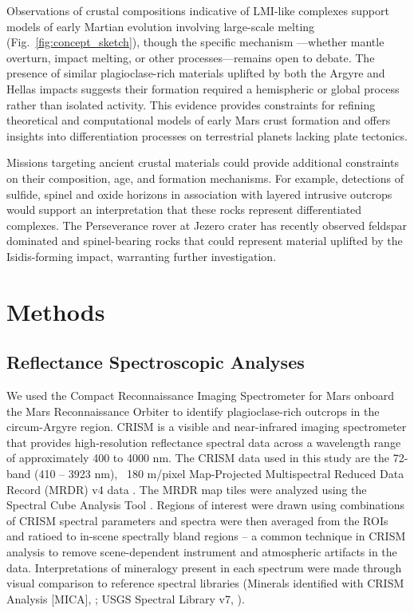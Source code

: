 \documentclass[12pt]{article}
\begin{document}
Observations of crustal compositions indicative of LMI-like complexes support models of early Martian evolution involving large-scale melting (Fig.~\ref{fig:concept_sketch}), though the specific mechanism ---whether mantle overturn, impact melting, or other processes---remains open to debate. The presence of similar plagioclase-rich materials uplifted by both the Argyre and Hellas impacts suggests their formation required a hemispheric or global process rather than isolated activity. This evidence provides constraints for refining theoretical and computational models of early Mars crust formation and offers insights into differentiation processes on terrestrial planets lacking plate tectonics.

Missions targeting ancient crustal materials could provide additional constraints on their composition, age, and formation mechanisms. For example, detections of sulfide, spinel and oxide horizons in association with layered intrusive outcrops would support an interpretation that these rocks represent differentiated complexes. The Perseverance rover at Jezero crater has recently observed feldspar dominated \citep{Bedford2024, Schmidt2025} and spinel-bearing rocks \citep{Mansbach2024, Bedford2024, Lawson2025} that could represent material uplifted by the Isidis-forming impact, warranting further investigation.

\section*{Methods}

\subsection*{Reflectance Spectroscopic Analyses}
We used the Compact Reconnaissance Imaging Spectrometer for Mars \citep[CRISM;][]{Murchie2007} onboard the Mars Reconnaissance Orbiter to identify plagioclase-rich outcrops in the circum-Argyre region. CRISM is a visible and near-infrared imaging spectrometer that provides high-resolution reflectance spectral data across a wavelength range of approximately 400 to 4000 nm. The CRISM data used in this study are the 72-band (410 – 3923 nm), ~180 m/pixel Map-Projected Multispectral Reduced Data Record (MRDR) v4 data \citep{Seelos2023,Murchie2024}. The MRDR map tiles were analyzed using the Spectral Cube Analysis Tool \citep{Phillips2024}. Regions of interest were drawn using combinations of CRISM spectral parameters \citep{Viviano2014} and spectra were then averaged from the ROIs and ratioed to in-scene spectrally bland regions -- a common technique in CRISM analysis to remove scene-dependent instrument and atmospheric artifacts in the data. Interpretations of mineralogy present in each spectrum were made through visual comparison to reference spectral libraries (Minerals identified with CRISM Analysis [MICA], \citealt{Viviano2014}; USGS Spectral Library v7, \citealt{Kokaly2017}).
\end{document}
